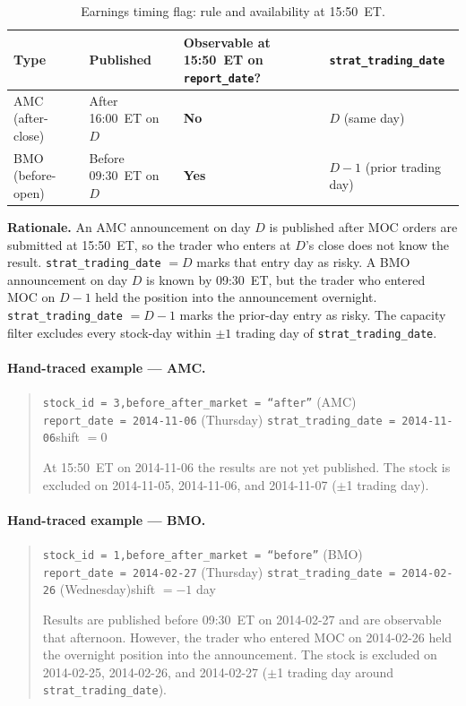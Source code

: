 \documentclass[12pt,a4paper]{article}
\begin{document}
\begin{table}[H]
\centering
\caption{Earnings timing flag: rule and availability at 15:50~ET.}
\label{tab:earnings_rule}
\begin{tabular}{p{3cm}p{3.5cm}p{3cm}p{3.5cm}}
\toprule
Type & Published & Observable at 15:50~ET on \texttt{report\_date}? & \texttt{strat\_trading\_date} \\
\midrule
AMC (after-close) & After 16:00~ET on $D$ & \textbf{No} & $D$ (same day) \\
BMO (before-open) & Before 09:30~ET on $D$ & \textbf{Yes} & $D - 1$ (prior trading day) \\
\bottomrule
\end{tabular}
\end{table}

\noindent\textbf{Rationale.}
An AMC announcement on day $D$ is published after MOC orders are submitted at
15:50~ET, so the trader who enters at $D$'s close does not know the result.
\texttt{strat\_trading\_date} $= D$ marks that entry day as risky.
A BMO announcement on day $D$ is known by 09:30~ET, but the trader who
entered MOC on $D-1$ held the position into the announcement overnight.
\texttt{strat\_trading\_date} $= D-1$ marks the prior-day entry as risky.
The capacity filter excludes every stock-day within $\pm 1$ trading day of
\texttt{strat\_trading\_date}.

\paragraph{Hand-traced example --- AMC.}
\begin{quote}
\texttt{stock\_id = 3,\quad before\_after\_market = ``after''} (AMC)\\
\texttt{report\_date = 2014-11-06} (Thursday)\quad
\texttt{strat\_trading\_date = 2014-11-06}\quad shift $= 0$ \checkmark

\smallskip
At 15:50~ET on 2014-11-06 the results are not yet published.  The stock is
excluded on 2014-11-05, 2014-11-06, and 2014-11-07 ($\pm$1 trading day).
\end{quote}

\paragraph{Hand-traced example --- BMO.}
\begin{quote}
\texttt{stock\_id = 1,\quad before\_after\_market = ``before''} (BMO)\\
\texttt{report\_date = 2014-02-27} (Thursday)\quad
\texttt{strat\_trading\_date = 2014-02-26} (Wednesday)\quad shift $= -1$ day \checkmark

\smallskip
Results are published before 09:30~ET on 2014-02-27 and are observable that
afternoon.  However, the trader who entered MOC on 2014-02-26 held the
overnight position into the announcement.  The stock is excluded on
2014-02-25, 2014-02-26, and 2014-02-27 ($\pm$1 trading day around
\texttt{strat\_trading\_date}).
\end{quote}
\end{document}
